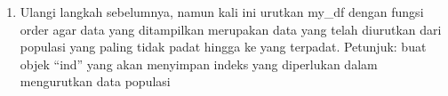 \documentclass[
]{article}
\newenvironment{Shaded}{\begin{snugshade}}{\end{snugshade}}
\newcommand{\AttributeTok}[1]{\textcolor[rgb]{0.77,0.63,0.00}{#1}}
\newcommand{\DecValTok}[1]{\textcolor[rgb]{0.00,0.00,0.81}{#1}}
\newcommand{\FunctionTok}[1]{\textcolor[rgb]{0.00,0.00,0.00}{#1}}
\newcommand{\NormalTok}[1]{#1}
\newcommand{\OtherTok}[1]{\textcolor[rgb]{0.56,0.35,0.01}{#1}}
\newcommand{\SpecialCharTok}[1]{\textcolor[rgb]{0.00,0.00,0.00}{#1}}
\providecommand{\tightlist}{%
  \setlength{\itemsep}{0pt}\setlength{\parskip}{0pt}}
\begin{document}
\begin{enumerate}
\def\labelenumi{\arabic{enumi}.}
\setcounter{enumi}{5}
\tightlist
\item
  Ulangi langkah sebelumnya, namun kali ini urutkan my\_df dengan fungsi
  order agar data yang ditampilkan merupakan data yang telah diurutkan
  dari populasi yang paling tidak padat hingga ke yang terpadat.
  Petunjuk: buat objek ``ind'' yang akan menyimpan indeks yang
  diperlukan dalam mengurutkan data populasi
\end{enumerate}

\begin{Shaded}
\end{Shaded}
\end{document}
